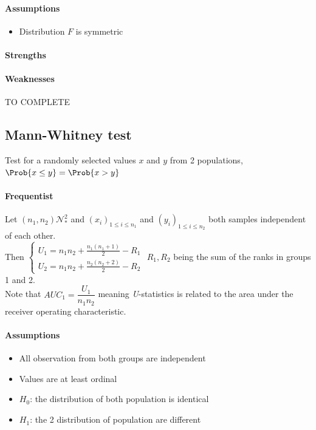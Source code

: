 \paragraph{Assumptions}
\begin{itemize}
    \item Distribution $F$ is symmetric
\end{itemize}

\paragraph{Strengths}
\paragraph{Weaknesses}

TO COMPLETE

\subsection{Mann-Whitney test}
Test for a randomly selected values $x$ and $y$ from 2 populations, $\Prob{x\leq y} = 
\Prob{x > y}$
\paragraph{Frequentist}
Let $(n_{1}, n_{2})\mathcal{N}_{*}^{2}$ and $\left(x_{i}\right)_{1\leq i\leq n_{1}}$
and $\left(y_{i}\right)_{1\leq i\leq n_{2}}$ both samples independent of each other.\\
Then
$\begin{cases}
    U_{1} = n_{1}n_{2} + \frac{n_{1}(n_{1} + 1)}{2} - R_{1} \\
    U_{2} = n_{1}n_{2} + \frac{n_{2}(n_{2} + 2)}{2} - R_{2} 
\end{cases}$
$R_{1}, R_{2}$ being the sum of the ranks in groups 1 and 2. \\
Note that $AUC_{1}=\dfrac{U_{1}}{n_{1}n_{2}}$ meaning \emph{U}-statistics is related to
the area under the receiver operating characteristic.


\paragraph{Assumptions}
\begin{itemize}
    \item All observation from both groups are independent
    \item Values are at least ordinal
    \item $H_{0}$: the distribution of both population is identical
    \item $H_{1}$: the 2 distribution of population are different
\end{itemize}


